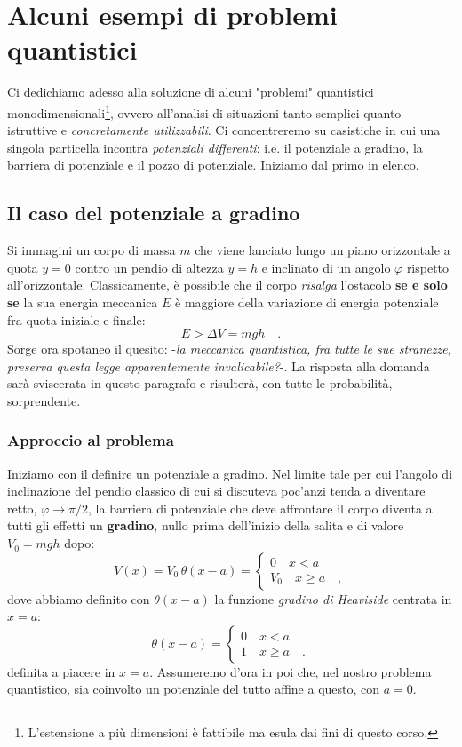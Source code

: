
\chapter{Alcuni esempi di problemi quantistici}
Ci dedichiamo adesso alla soluzione di alcuni "problemi" quantistici monodimensionali\footnote{L'estensione a più dimensioni è fattibile ma esula dai fini di questo corso.}, ovvero all'analisi di situazioni tanto semplici quanto istruttive e \emph{concretamente utilizzabili}. Ci concentreremo su casistiche in cui una singola particella incontra \emph{potenziali differenti}: i.e. il potenziale a gradino, la barriera di potenziale e il pozzo di potenziale. Iniziamo dal primo in elenco.

\section{Il caso del potenziale a gradino}
Si immagini un corpo di massa $m$ che viene lanciato lungo un piano orizzontale a quota $y = 0$ contro un pendio di altezza $y = h$ e inclinato di un angolo $\varphi$ rispetto all'orizzontale. Classicamente, è possibile che il corpo \emph{risalga} l'ostacolo \textbf{se e solo se} la sua energia meccanica $E$ è maggiore della variazione di energia potenziale fra quota iniziale e finale:
\[
    E > \Delta V = mgh \quad.
\]
Sorge ora spotaneo il quesito: -\emph{la meccanica quantistica, fra tutte le sue stranezze, preserva questa legge apparentemente invalicabile?}-. La risposta alla domanda sarà sviscerata in questo paragrafo e risulterà, con tutte le probabilità, sorprendente.

\subsection{Approccio al problema}
Iniziamo con il definire un potenziale a gradino. Nel limite tale per cui l'angolo di inclinazione del pendio classico di cui si discuteva poc'anzi tenda a diventare retto, $\varphi \to \pi/2$, la barriera di potenziale che deve affrontare il corpo diventa a tutti gli effetti un \textbf{gradino}, nullo prima dell'inizio della salita e di valore $V_0 = mgh$ dopo:
\[
    V(x) = V_0 \, \theta(x-a) = \begin{cases}
        0 \quad x < a \\
        V_0 \quad x \geq a \quad,
    \end{cases}
\]
dove abbiamo definito con $\theta(x-a)$ la funzione \textit{gradino di Heaviside} centrata in $x = a$:
\[
    \theta(x-a) = \begin{cases}
    0 \quad x < a \\
    1 \quad x \geq a \quad .
    \end{cases}
\]
definita a piacere in $x = a$. Assumeremo d'ora in poi che, nel nostro problema quantistico, sia coinvolto un potenziale del tutto affine a questo, con $a = 0$. 

